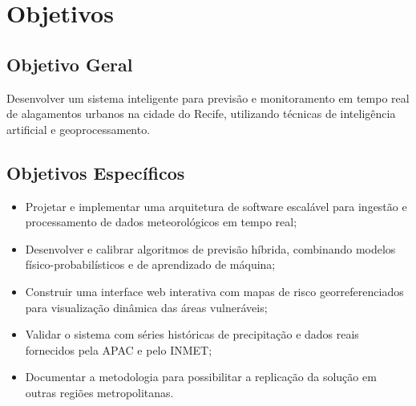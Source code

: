 \section{Objetivos}

\subsection{Objetivo Geral}

Desenvolver um sistema inteligente para previsão e monitoramento em tempo real de alagamentos urbanos na cidade do Recife, utilizando técnicas de inteligência artificial e geoprocessamento.

\subsection{Objetivos Específicos}

\begin{itemize}
    \item Projetar e implementar uma arquitetura de software escalável para ingestão e processamento de dados meteorológicos em tempo real;
    \item Desenvolver e calibrar algoritmos de previsão híbrida, combinando modelos físico-probabilísticos e de aprendizado de máquina;
    \item Construir uma interface web interativa com mapas de risco georreferenciados para visualização dinâmica das áreas vulneráveis;
    \item Validar o sistema com séries históricas de precipitação e dados reais fornecidos pela APAC e pelo INMET;
    \item Documentar a metodologia para possibilitar a replicação da solução em outras regiões metropolitanas.
\end{itemize}
